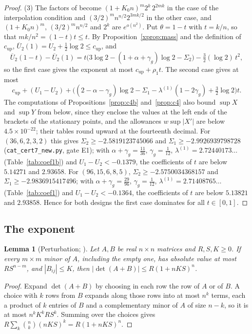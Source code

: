 \documentclass[11pt]{article}
\newtheorem{lemma}[theorem]{Lemma}
\theoremstyle{definition}
\begin{document}
\begin{proof}
(3) The factors of \cite[(6.8)--(6.9)]{Jha} become $(1+K_0n)^m2^k\,2^{2mk}$ in the case of the interpolation condition and $(3/2)^mn^{n/2}2^{3mk/2}$ in the other case, and $(1+K_0n)^m$, $(3/2)^mn^{n/2}$ and $2^k$ are $e^{o(n^2)}$. Put $\theta=1-t$ with $t=k/n$, so that $mk/n^2=(1-t)t\le t$. By Proposition~\ref{xprop:mass} and the definition of $c_{\mathrm{up}}$, $\overline U_2(1)=U_2+\frac12\log2\le c_{\mathrm{up}}$, and
\[
\overline U_2(1-t)-\overline U_2(1)=t\big(3\log2-(1+\alpha+\gamma_g)\log2-\Sigma_2\big)-\tfrac32(\log2)\,t^2,
\]
so the first case gives the exponent at most $c_{\mathrm{up}}+\rho_1t$. The second case gives at most
\[
c_{\mathrm{up}}+(U_1-U_2)+\big((2-\alpha-\gamma_g)\log2-\Sigma_1-\lambda^{(1)}(1-2\gamma_g)+\tfrac32\log2\big)t .
\]
The computations of Propositions~\ref{prop:c4b} and~\ref{prop:c4} also bound $\sup X$ and $\sup Y$ from below, since they enclose the values at the left ends of the brackets of the stationary points, and the allowances $w\sup|X'|$ are below $4.5\times10^{-22}$; their tables round upward at the fourteenth decimal. For $(36,6,2,3,2)$ this gives $\Sigma_2\ge-2.5819123745066$ and $\Sigma_1\ge-2.9926939798728$ (\texttt{cat\_cert7\_new.py}, gate E1); with $\alpha+\gamma_g=\frac{11}{36}$, $\gamma_g=\frac1{12}$, $\lambda^{(1)}=2.72440173\ldots$ (Table~\ref{tab:coef1b}) and $U_1-U_2<-0.1379$, the coefficients of $t$ are below $5.14271$ and $2.93658$. For $(96,15,6,8,5)$, $\Sigma_2\ge-2.5750034368157$ and $\Sigma_1\ge-2.9836915417496$; with $\alpha+\gamma_g=\frac{29}{96}$, $\gamma_g=\frac1{12}$, $\lambda^{(1)}=2.71408765\ldots$ (Table~\ref{tab:coef1}) and $U_1-U_2<-0.1364$, the coefficients of $t$ are below $5.13821$ and $2.93858$. Hence for both designs the first case dominates for all $t\in[0,1]$.
\end{proof}

\subsection{The exponent}\label{xsec:results}

\begin{lemma}[Perturbation; {\cite[Lemma~7.1]{Jha}}]\label{xlem:pert}
Let $A,B$ be real $n\times n$ matrices and $R,S,K\ge0$. If every $m\times m$ minor of $A$, including the empty one, has absolute value at most $RS^{n-m}$, and $|B_{ij}|\le K$, then $|\det(A+B)|\le R(1+nKS)^n$.
\end{lemma}

\begin{proof}
Expand $\det(A+B)$ by choosing in each row the row of $A$ or of $B$. A choice with $k$ rows from $B$ expands along those rows into at most $n^k$ terms, each a product of $k$ entries of $B$ and a complementary minor of $A$ of size $n-k$, so it is at most $n^kK^kRS^k$. Summing over the choices gives $R\sum_k\binom nk(nKS)^k=R(1+nKS)^n$.
\end{proof}
\end{document}
